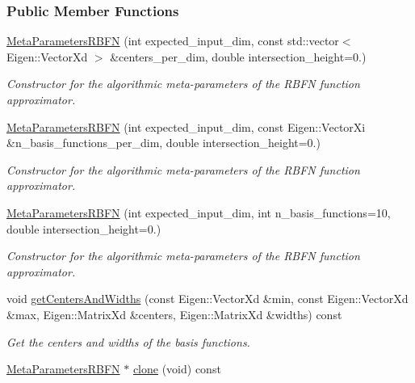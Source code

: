 \subsubsection*{Public Member Functions}
\begin{DoxyCompactItemize}
\item 
\hyperlink{classDmpBbo_1_1MetaParametersRBFN_a9ce4826ac71675b2bebe3a9d7e095de8}{Meta\+Parameters\+R\+B\+F\+N} (int expected\+\_\+input\+\_\+dim, const std\+::vector$<$ Eigen\+::\+Vector\+Xd $>$ \&centers\+\_\+per\+\_\+dim, double intersection\+\_\+height=0.)
\begin{DoxyCompactList}\small\item\em Constructor for the algorithmic meta-\/parameters of the R\+B\+F\+N function approximator. \end{DoxyCompactList}\item 
\hyperlink{classDmpBbo_1_1MetaParametersRBFN_a829cd0a2a44051113372839e96891467}{Meta\+Parameters\+R\+B\+F\+N} (int expected\+\_\+input\+\_\+dim, const Eigen\+::\+Vector\+Xi \&n\+\_\+basis\+\_\+functions\+\_\+per\+\_\+dim, double intersection\+\_\+height=0.)
\begin{DoxyCompactList}\small\item\em Constructor for the algorithmic meta-\/parameters of the R\+B\+F\+N function approximator. \end{DoxyCompactList}\item 
\hyperlink{classDmpBbo_1_1MetaParametersRBFN_af6d4ec88a62293f6f6783ef8814c1739}{Meta\+Parameters\+R\+B\+F\+N} (int expected\+\_\+input\+\_\+dim, int n\+\_\+basis\+\_\+functions=10, double intersection\+\_\+height=0.)
\begin{DoxyCompactList}\small\item\em Constructor for the algorithmic meta-\/parameters of the R\+B\+F\+N function approximator. \end{DoxyCompactList}\item 
void \hyperlink{classDmpBbo_1_1MetaParametersRBFN_ab4dfc7a149e6637cb3e610ad827e3477}{get\+Centers\+And\+Widths} (const Eigen\+::\+Vector\+Xd \&min, const Eigen\+::\+Vector\+Xd \&max, Eigen\+::\+Matrix\+Xd \&centers, Eigen\+::\+Matrix\+Xd \&widths) const 
\begin{DoxyCompactList}\small\item\em Get the centers and widths of the basis functions. \end{DoxyCompactList}\item 
\hyperlink{classDmpBbo_1_1MetaParametersRBFN}{Meta\+Parameters\+R\+B\+F\+N} $\ast$ \hyperlink{classDmpBbo_1_1MetaParametersRBFN_aff6b06f21d73f9f2dd946179c16f1f91}{clone} (void) const 

\end{DoxyCompactItemize}
